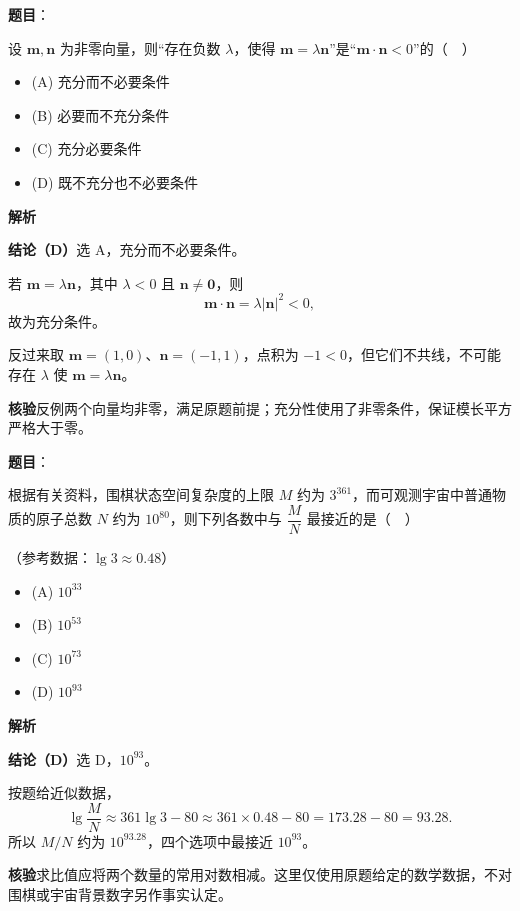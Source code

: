 \begin{answer}

\textbf{题目}：

设 $\boldsymbol m,\boldsymbol n$ 为非零向量，则“存在负数 $\lambda$，使得 $\boldsymbol m=\lambda\boldsymbol n$”是“$\boldsymbol m\cdot\boldsymbol n<0$”的（　）

\begin{itemize}
\item (A) 充分而不必要条件
\item (B) 必要而不充分条件
\item (C) 充分必要条件
\item (D) 既不充分也不必要条件
\end{itemize}

\textbf{解析}

\textbf{结论（D）}选 A，充分而不必要条件。

若 $\boldsymbol m=\lambda\boldsymbol n$，其中 $\lambda<0$ 且 $\boldsymbol n\ne\boldsymbol0$，则
\nopagebreak[4]
\[
\boldsymbol m\cdot\boldsymbol n=\lambda|\boldsymbol n|^2<0,
\]
故为充分条件。

反过来取 $\boldsymbol m=(1,0)$、$\boldsymbol n=(-1,1)$，点积为 $-1<0$，但它们不共线，不可能存在 $\lambda$ 使 $\boldsymbol m=\lambda\boldsymbol n$。

\textbf{核验}反例两个向量均非零，满足原题前提；充分性使用了非零条件，保证模长平方严格大于零。


\end{answer}
\begin{answer}

\textbf{题目}：

根据有关资料，围棋状态空间复杂度的上限 $M$ 约为 $3^{361}$，而可观测宇宙中普通物质的原子总数 $N$ 约为 $10^{80}$，则下列各数中与 $\dfrac MN$ 最接近的是（　）

（参考数据：$\lg3\approx0.48$）

\begin{itemize}
\item (A) $10^{33}$
\item (B) $10^{53}$
\item (C) $10^{73}$
\item (D) $10^{93}$
\end{itemize}

\textbf{解析}

\textbf{结论（D）}选 D，$10^{93}$。

按题给近似数据，
\nopagebreak[4]
\[
\lg\frac MN\approx361\lg3-80
\approx361\times0.48-80
=173.28-80=93.28.
\]
所以 $M/N$ 约为 $10^{93.28}$，四个选项中最接近 $10^{93}$。

\textbf{核验}求比值应将两个数量的常用对数相减。这里仅使用原题给定的数学数据，不对围棋或宇宙背景数字另作事实认定。


\end{answer}
